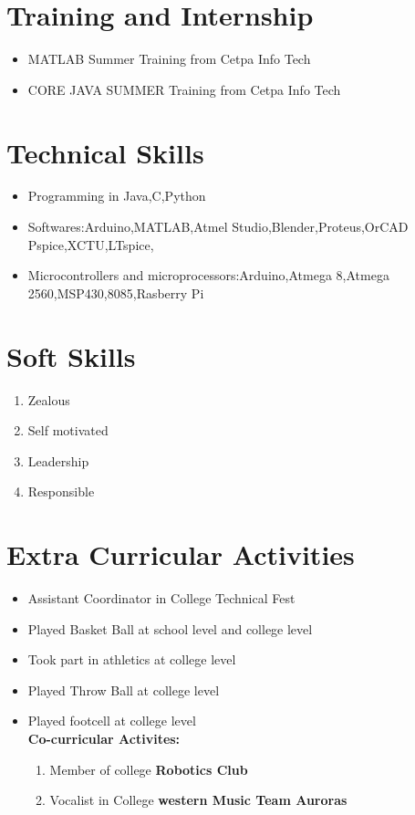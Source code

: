 \documentclass[8pt]{article}
\begin{document}
\section{Training and Internship}
\begin{itemize}
 \item MATLAB Summer Training from Cetpa Info Tech%
 \item CORE JAVA SUMMER Training from Cetpa Info Tech
 
\end{itemize}
\newpage
\section{Technical Skills}
\begin{itemize}
\item Programming in Java,C,Python
\item Softwares:Arduino,MATLAB,Atmel Studio,Blender,Proteus,OrCAD Pspice,XCTU,LTspice,
 \item Microcontrollers and microprocessors:Arduino,Atmega 8,Atmega 2560,MSP430,8085,Rasberry Pi
 \end{itemize}

\section{Soft Skills}
\begin{enumerate}
\item Zealous
\item Self motivated
\item Leadership
\item Responsible
\end{enumerate}
\section{Extra Curricular Activities}
\begin{itemize}
\item Assistant Coordinator in College Technical Fest
\item Played Basket Ball at school level and college level
\item Took part in athletics at college level
\item Played Throw Ball at college level
\item Played footcell at college level \\
\textbf{Co-curricular Activites:}
\begin{enumerate}
\item Member of college \textbf{Robotics Club}
\item Vocalist in College \textbf{western Music Team Auroras}
\end{enumerate}
\end{itemize}
\end{document}
